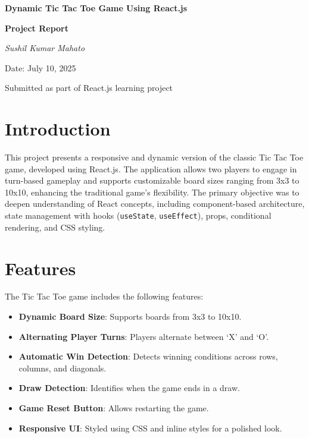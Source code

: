 \documentclass[a4paper,12pt]{article}
\begin{document}
\begin{titlepage}
    \centering
    \vspace*{2cm}
    {\Huge\bfseries Dynamic Tic Tac Toe Game Using React.js \par}
    \vspace{1.5cm}
    {\Large\bfseries Project Report \par}
    \vspace{2cm}
    {\large\itshape Sushil Kumar Mahato \par}
    \vspace{0.5cm}
    {\large Date: July 10, 2025 \par}
    \vspace{2cm}
    {\large Submitted as part of React.js learning project \par}
    \vfill
\end{titlepage}

\section{Introduction}
This project presents a responsive and dynamic version of the classic Tic Tac Toe game, developed using React.js. The application allows two players to engage in turn-based gameplay and supports customizable board sizes ranging from 3x3 to 10x10, enhancing the traditional game’s flexibility. The primary objective was to deepen understanding of React concepts, including component-based architecture, state management with hooks (\texttt{useState}, \texttt{useEffect}), props, conditional rendering, and CSS styling.

\section{Features}
The Tic Tac Toe game includes the following features:
\begin{itemize}
    \item \textbf{Dynamic Board Size}: Supports boards from 3x3 to 10x10.
    \item \textbf{Alternating Player Turns}: Players alternate between `X' and `O'.
    \item \textbf{Automatic Win Detection}: Detects winning conditions across rows, columns, and diagonals.
    \item \textbf{Draw Detection}: Identifies when the game ends in a draw.
    \item \textbf{Game Reset Button}: Allows restarting the game.
    \item \textbf{Responsive UI}: Styled using CSS and inline styles for a polished look.
\end{itemize}
\end{document}
